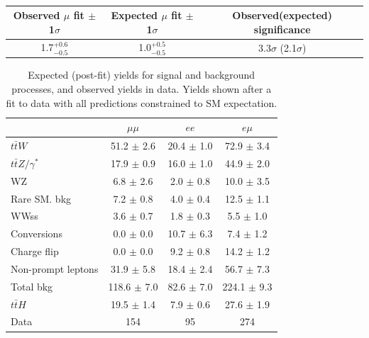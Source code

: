 \begin{table}[htbp]
\begin{center}
  \caption[Table of best-fit signal strength]{}
    \begin{tabular}{c c c} \hline
      Observed $\mu$ fit $\pm$1$\sigma$ & Expected $\mu$ fit $\pm$1$\sigma$ & Observed(expected) significance & \\ \hline 
      1.7$^{+0.6}_{-0.5}$ & 1.0$^{+0.5}_{-0.5}$ & 3.3$\sigma$ (2.1$\sigma$)  \\
      \hline
    \end{tabular}
    \label{tab:mu}
\end{center}
\end{table}


\begin{table}[htbp]
  \begin{center}
    \caption[Signal region post-fit event yields by lepton flavor]{Expected (post-fit) yields for signal and background processes, and observed yields in data. Yields
      shown after a fit to data with all predictions constrained to SM expectation.}
    \begin{tabular}{l c c c} \hline
      & $\mu\mu$ & $ee$ & $e\mu$  \\ \hline 
      $t\bar{t}W$ & 51.2 $\pm$ 2.6 & 20.4 $\pm$ 1.0 & 72.9 $\pm$ 3.4 \\
      $t\bar{t}Z/\gamma^{*}$ & 17.9 $\pm$ 0.9 & 16.0 $\pm$ 1.0 & 44.9 $\pm$ 2.0 \\
      \hline
      WZ & 6.8 $\pm$ 2.6 & 2.0 $\pm$ 0.8 & 10.0 $\pm$ 3.5 \\
      Rare SM. bkg & 7.2 $\pm$ 0.8 & 4.0 $\pm$ 0.4 & 12.5 $\pm$ 1.1 \\
      WWss & 3.6 $\pm$ 0.7 & 1.8 $\pm$ 0.3 & 5.5 $\pm$ 1.0 \\
      \hline
      Conversions & 0.0 $\pm$ 0.0 & 10.7 $\pm$ 6.3 & 7.4 $\pm$ 1.2 \\
      Charge flip & 0.0 $\pm$ 0.0 & 9.2 $\pm$ 0.8 & 14.2 $\pm$ 1.2 \\
      Non-prompt leptons & 31.9 $\pm$ 5.8 & 18.4 $\pm$ 2.4 & 56.7 $\pm$ 7.3 \\
      \hline
      Total bkg & 118.6 $\pm$ 7.0 & 82.6 $\pm$ 7.0 & 224.1 $\pm$ 9.3 \\
      \hline
      $t\bar{t}H$ & 19.5 $\pm$ 1.4 & 7.9 $\pm$ 0.6 & 27.6 $\pm$ 1.9 \\
      \hline
      Data & 154 & 95 & 274 \\
      \hline
    \end{tabular}
    \label{tab:postfit_yields}
  \end{center}
\end{table}


